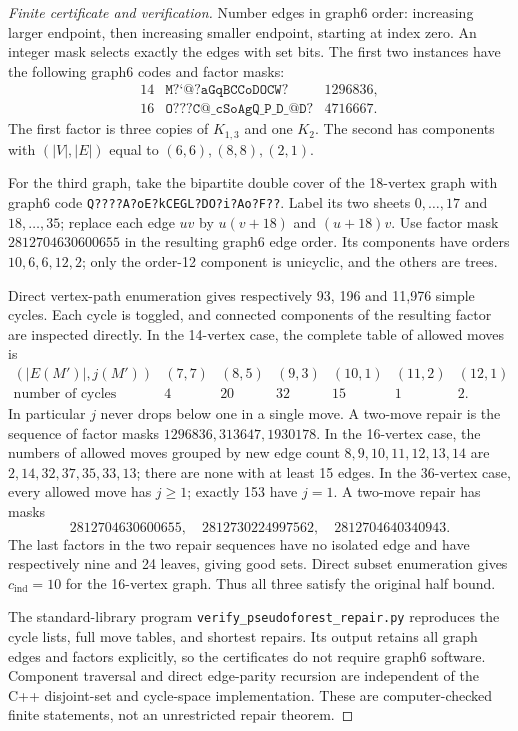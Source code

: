 \documentclass[11pt]{article}
\newcommand{\cind}{c_{\mathrm{ind}}}
\begin{document}
\begin{proof}[Finite certificate and verification]
Number edges in graph6 order: increasing larger endpoint, then
increasing smaller endpoint, starting at index zero. An integer
mask selects exactly the edges with set bits. The first two
instances have the following graph6 codes and factor masks:
\[
\begin{array}{ccl}
14&\texttt{M?`@?aGqBCCoDOCW?}&1296836,\\
16&\texttt{O???C@\_cSoAgQ\_P\_D\_@D?}&4716667.
\end{array}
\]
The first factor is three copies of $K_{1,3}$ and one $K_2$.
The second has components with $(|V|,|E|)$ equal to
$(6,6),(8,8),(2,1)$.

For the third graph, take the bipartite double cover of the
18-vertex graph with graph6 code
\texttt{Q????A?oE?kCEGL?DO?i?Ao?F??}.
Label its two sheets $0,\ldots,17$ and $18,\ldots,35$; replace
each edge $uv$ by $u(v+18)$ and $(u+18)v$. Use factor mask
$2812704630600655$ in the resulting graph6 edge order.
Its components have orders $10,6,6,12,2$; only the order-12
component is unicyclic, and the others are trees.

Direct vertex-path enumeration gives respectively 93, 196 and
11,976 simple cycles. Each cycle is toggled, and connected
components of the resulting factor are inspected directly.
In the 14-vertex case, the complete table of allowed moves is
\[
\begin{array}{c|rrrrrr}
(|E(M')|,j(M'))&(7,7)&(8,5)&(9,3)&(10,1)&(11,2)&(12,1)\\
\text{number of cycles}&4&20&32&15&1&2.
\end{array}
\]
In particular $j$ never drops below one in a single move.
A two-move repair is the sequence of factor masks
$1296836,313647,1930178$.
In the 16-vertex case, the numbers of allowed moves grouped by
new edge count $8,9,10,11,12,13,14$ are
$2,14,32,37,35,33,13$; there are none with at least 15 edges.
In the 36-vertex case, every allowed move has $j\geq1$;
exactly 153 have $j=1$. A two-move repair has masks
\[
2812704630600655,\quad
2812730224997562,\quad
2812704640340943.
\]
The last factors in the two repair sequences have no isolated
edge and have respectively nine and 24 leaves, giving good sets.
Direct subset enumeration gives $\cind=10$ for the 16-vertex graph.
Thus all three satisfy the original half bound.

The standard-library program
\texttt{verify\_pseudoforest\_repair.py} reproduces the cycle
lists, full move tables, and shortest repairs. Its output retains
all graph edges and factors explicitly, so the certificates do
not require graph6 software. Component traversal and direct
edge-parity recursion are independent of the C++ disjoint-set
and cycle-space implementation. These are computer-checked
finite statements, not an unrestricted repair theorem.
\end{proof}
\end{document}

